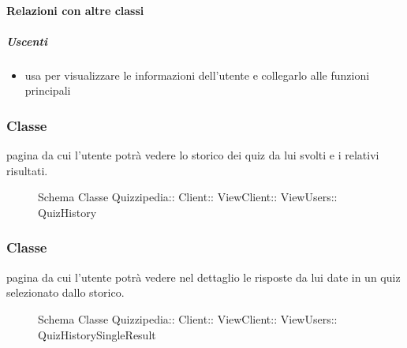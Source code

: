\paragraph{Relazioni con altre classi}
\subparagraph{Uscenti}
\begin{itemize}
\item usa  per visualizzare le informazioni dell'utente e collegarlo alle funzioni principali
\end{itemize}
\subsubsection{Classe }
pagina da cui l'utente potrà vedere lo storico dei quiz da lui svolti e i relativi risultati.
\begin{figure}[H]
\centering
\noindent{}
\caption[Schema Classe QuizHistory]{Schema Classe Quizzipedia:: Client:: ViewClient:: ViewUsers:: QuizHistory}
\end{figure}
\subsubsection{Classe }
pagina da cui l'utente potrà vedere nel dettaglio le risposte da lui date in un quiz selezionato dallo storico.
\begin{figure}[H]
\centering
\noindent{}
\caption[Schema Classe QuizHistorySingleResult]{Schema Classe Quizzipedia:: Client:: ViewClient:: ViewUsers:: QuizHistorySingleResult}
\end{figure}

